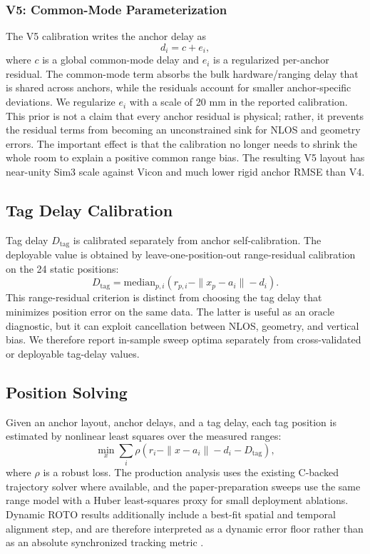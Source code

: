 \subsubsection{V5: Common-Mode Parameterization}
The V5 calibration writes the anchor delay as
\[
  d_i = c + e_i,
\]
where \(c\) is a global common-mode delay and \(e_i\) is a regularized per-anchor residual. The common-mode term absorbs the bulk hardware/ranging delay that is shared across anchors, while the residuals account for smaller anchor-specific deviations. We regularize \(e_i\) with a scale of 20 mm in the reported calibration. This prior is not a claim that every anchor residual is physical; rather, it prevents the residual terms from becoming an unconstrained sink for NLOS and geometry errors. The important effect is that the calibration no longer needs to shrink the whole room to explain a positive common range bias. The resulting V5 layout has near-unity Sim3 scale against Vicon and much lower rigid anchor RMSE than V4.

\subsection{Tag Delay Calibration}
Tag delay \(D_{\mathrm{tag}}\) is calibrated separately from anchor self-calibration. The deployable value is obtained by leave-one-position-out range-residual calibration on the 24 static positions:
\[
  D_{\mathrm{tag}} = \mathrm{median}_{p,i}\left(r_{p,i} - \|x_p-a_i\| - d_i\right).
\]
This range-residual criterion is distinct from choosing the tag delay that minimizes position error on the same data. The latter is useful as an oracle diagnostic, but it can exploit cancellation between NLOS, geometry, and vertical bias. We therefore report in-sample sweep optima separately from cross-validated or deployable tag-delay values.

\subsection{Position Solving}
Given an anchor layout, anchor delays, and a tag delay, each tag position is estimated by nonlinear least squares over the measured ranges:
\[
  \min_x \sum_i \rho\left(r_i - \|x-a_i\| - d_i - D_{\mathrm{tag}}\right),
\]
where \(\rho\) is a robust loss. The production analysis uses the existing C-backed trajectory solver where available, and the paper-preparation sweeps use the same range model with a Huber least-squares proxy for small deployment ablations. Dynamic ROTO results additionally include a best-fit spatial and temporal alignment step, and are therefore interpreted as a dynamic error floor rather than as an absolute synchronized tracking metric \cite{ss_twr_reference,selfcal_xxx}.
